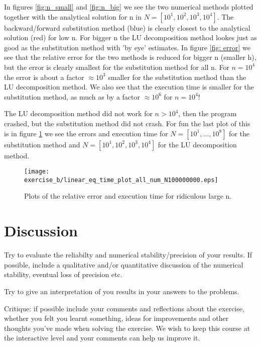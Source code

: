 \documentclass[11pt,a4wide]{article}
\begin{document}
In figures \ref{fig:n_small} and \ref{fig:n_big} we see the two numerical methods plotted together with the analytical solution for n in $N = [10^1, 10^2, 10^3, 10^4]$. The backward/forward substitution method (blue) is clearly closest to the analytical solution (red) for low n. For bigger n the LU decomposition method lookes just as good as the substitution method with 'by eye' estimates. In figure \ref{fig: error} we see that the relative error for the two methods is reduced for bigger n (smaller h), but the error is clearly smallest for the substitution method for all n. For $n=10^4$ the error is about a factor $\approx10^3$ smaller for the substitution method than the LU decomposition method. We also see that the execution time is smaller for the substitution method, as much as by a factor $\approx10^6$ for $n=10^4$!

The LU decomposition method did not work for $n>10^4$, then the program crashed, but the substitution method did not crash. For fun the last plot of this is in figure \ref{fig:tull} we see the errors and execution time for $N = [10^1, \dots, 10^8]$ for the substitution method and $N = [10^1, 10^2, 10^3, 10^4]$ for the LU decomposition method. 

\begin{figure}[htp]
\caption{Plots of the relative error and execution time for ridiculous large n.}
\centering
\texttt{[image: exercise\_b/linear\_eq\_time\_plot\_all\_num\_N100000000.eps]}
\label{fig:tull}
\end{figure}


\section{Discussion}


Try to evaluate the reliabilty and numerical stability/precision
of your results. If possible, include a qualitative and/or quantitative
discussion of the numerical stability, eventual loss of precision etc. 

Try to give an interpretation of you results in your answers to 
the problems.

Critique: if possible include your comments and reflections about the 
exercise, whether you felt you learnt something, ideas for improvements and 
other thoughts you've made when solving the exercise.
We wish to keep this course at the interactive level and your comments can help
us improve it.
\end{document}
